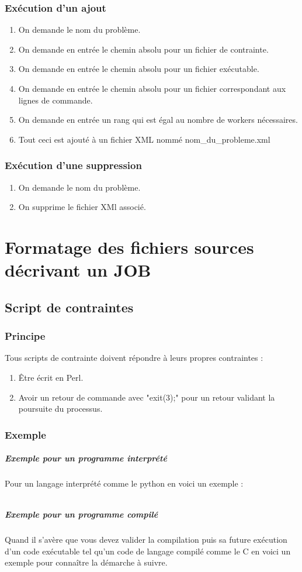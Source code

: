 \documentclass[11pt]{article}
\begin{document}
\subsubsection{Exécution d'un ajout}
\begin{enumerate}
\item On demande le nom du problème.
\item On demande en entrée le chemin absolu pour un fichier de contrainte.
\item On demande en entrée le chemin absolu pour un fichier exécutable.
\item On demande en entrée le chemin absolu pour un fichier correspondant aux lignes de commande.
\item On demande en entrée un rang qui est égal au nombre de workers nécessaires. 
\item Tout ceci est ajouté à un fichier XML nommé nom\_du\_probleme.xml
\end{enumerate}

\newpage\subsubsection{Exécution d'une suppression}
\begin{enumerate}
\item On demande le nom du problème. 
\item On supprime le fichier XMl associé. 
\end{enumerate}
\newpage
\section{Formatage des fichiers sources décrivant un JOB}
\subsection{Script de contraintes}
\subsubsection{Principe}
Tous scripts de contrainte doivent répondre à leurs propres contraintes :
\begin{enumerate}
\item Être écrit en Perl.
\item Avoir un retour de commande avec "exit(3);" pour un retour validant la poursuite du processus. 

\end{enumerate}
\subsubsection{Exemple}
\subparagraph{Exemple pour un programme interprété}
Pour un langage interprété comme le python en voici un exemple :
\inputminted{perl}{../Echantillon_Script_Perl/nqueen.pl}
\subparagraph{Exemple pour un programme compilé }
Quand il s'avère que vous devez valider la compilation puis sa future exécution d'un code exécutable tel qu'un code de langage compilé comme le C en voici un exemple pour connaître la démarche  à suivre.  
\inputminted{perl}{../Echantillon_Script_Perl/langford.pl}
\end{document}
